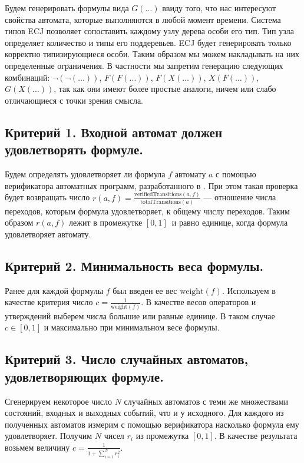 \documentclass[12pt,fleqn]{article}
\begin{document}
Будем генерировать формулы вида $G(\ldots)$ ввиду того, что нас интересуют свойства автомата, которые выполняются
в любой момент времени. Система типов ECJ позволяет сопоставить каждому узлу дерева особи его тип. Тип узла
определяет количество и типы его поддеревьев. ECJ будет генерировать только корректно типизирующиеся особи.
Таким образом мы можем накладывать на них определенные ограничения. В частности мы запретим генерацию следующих
комбинаций: $\lnot(\lnot(\ldots))$, $F(F(\ldots))$, $F(X(\ldots))$, $X(F(\ldots))$, $G(X(\ldots))$, так как
они имеют более простые аналоги, ничем или слабо отличающиеся с точки зрения смысла.

\subsection{Критерий 1. Входной автомат должен удовлетворять формуле.}

Будем определять удовлетворяет ли формула $f$ автомату $a$ с помощью верификатора автоматных программ, разработанного в \cite{eg}.
При этом такая проверка будет возвращать число $r(a, f) = \frac{\text{verifiedTransitions}(a, f)}{\text{totalTransitions}(a)}$ --- отношение числа
переходов, которым формула удовлетворяет, к общему числу переходов. Таким образом $r(a, f)$ лежит в промежутке $[0, 1]$\ и равно
единице, когда формула удовлетворяет автомату.

\subsection{Критерий 2. Минимальность веса формулы.}

Ранее для каждой формулы $f$ был введен ее вес $\text{weight}(f)$. Используем в качестве критерия число $c = \frac{1}{\text{weight}(f)}$.
В качестве весов операторов и утверждений выберем числа большие или равные единице.
В таком случае $c \in [0, 1]$ и максимально при минимальном весе формулы.

\subsection{Критерий 3. Число случайных автоматов, удовлетворяющих формуле.}

Сгенерируем некоторое число $N$ случайных автоматов с теми же множествами состояний, входных и выходных событий, что и
у исходного. Для каждого из полученных автоматов измерим с помощью верификатора насколько формула ему удовлетворяет.
Получим $N$ чисел $r_i$ из промежутка $[0, 1]$. В качестве результата возьмем величину $c = \frac{1}{1 + \sum_{i = 1}^{N}r_i^2}$.
\end{document}
